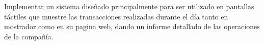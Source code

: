Implementar un sistema diseñado principalmente para ser utilizado en pantallas táctiles que muestre las transacciones realizadas durante el día tanto en mostrador como en su pagina web, dando un informe detallado de las operaciones de la compañía.